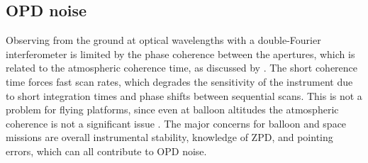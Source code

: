 
\subsection{OPD noise}
\label{subsec:phnoise}
Observing from the ground at optical wavelengths with a double-Fourier interferometer is limited by the phase coherence 
between the apertures, which is related to the atmospheric coherence time, as discussed by \cite{Mariotti:1988vea}. The short coherence time forces fast scan rates, which degrades the sensitivity of the instrument due to short integration times and phase shifts between sequential scans. 
This is not a problem for flying platforms, since even at balloon altitudes the atmospheric coherence is not a significant 
issue \citep{Rizzo:2012jp}. The major concerns for balloon and space missions are overall instrumental stability, knowledge of ZPD, and pointing errors, which can all contribute to OPD noise.

